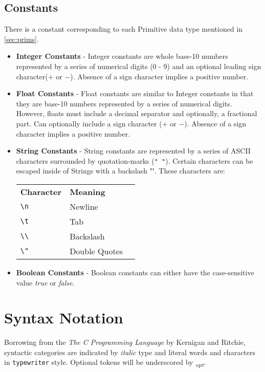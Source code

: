 \documentclass{article}
\begin{document}
\subsection{Constants}
\label{sec:const}
There is a constant corresponding to each Primitive data type mentioned in \ref{sec:prims}.

\begin{itemize}
\item \textbf{Integer Constants} - Integer constants are whole base-10 numbers represented by a series of numerical digits (0 - 9) and an optional leading sign character($+$ or $-$). Absence of a sign character implies a positive number.

\item \textbf{Float Constants} - Float constants are similar to Integer constants in that they are base-10 numbers represented by a series of numerical digits. However, floats must include a decimal separator and optionally, a fractional part. Can optionally include a sign character ($+$ or $-$). Absence of a sign character implies a positive number.

\item \textbf{String Constants} - String constants are represented by a series of ASCII characters surrounded by quotation-marks (\texttt{" "}). Certain characters can be escaped inside of Strings with a backslash \textbf{'\'}. These characters are:

\begin{tabular}{ l | l | l }
\textbf{Character} & \textbf{Meaning} \\
\texttt{\textbackslash n } & Newline \\
\texttt{\textbackslash t} & Tab \\
\texttt{\textbackslash  \textbackslash} & Backslash \\
\texttt{\textbackslash " } & Double Quotes \\
\end{tabular}

\item \textbf{Boolean Constants} - Boolean constants can either have the case-sensitive value \emph{true} or \emph{false}.

\end{itemize}

\section{Syntax Notation}
Borrowing from the \emph{The C Programming Language} by Kernigan and Ritchie, syntactic categories are indicated by \emph{italic} type and literal words and characters in \texttt{typewriter} style. Optional tokens will be underscored by \textsubscript{\emph{opt}}.
\end{document}
